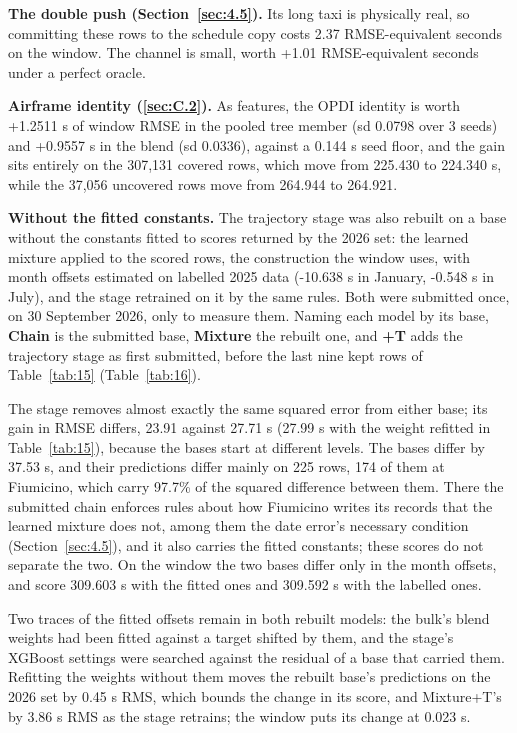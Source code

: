 \documentclass[
  manuscript=article,
  layout=preprint,
  year=2026,
  volume=x,
]{extra/joas}
\begin{document}
\textbf{The double push (Section~\ref{sec:4.5}).} Its long taxi is physically real, so committing these rows to the schedule copy costs 2.37 RMSE-equivalent seconds on the window. The channel is small, worth +1.01 RMSE-equivalent seconds under a perfect oracle.

\textbf{Airframe identity (\ref{sec:C.2}).} As features, the OPDI identity is worth +1.2511 s of window RMSE in the pooled tree member (sd 0.0798 over 3 seeds) and +0.9557 s in the blend (sd 0.0336), against a 0.144 s seed floor, and the gain sits entirely on the 307,131 covered rows, which move from 225.430 to 224.340 s, while the 37,056 uncovered rows move from 264.944 to 264.921.

\textbf{Without the fitted constants.} The trajectory stage was also rebuilt on a base without the constants fitted to scores returned by the 2026 set: the learned mixture applied to the scored rows, the construction the window uses, with month offsets estimated on labelled 2025 data (-10.638 s in January, -0.548 s in July), and the stage retrained on it by the same rules. Both were submitted once, on 30 September 2026, only to measure them. Naming each model by its base, \textbf{Chain} is the submitted base, \textbf{Mixture} the rebuilt one, and \textbf{+T} adds the trajectory stage as first submitted, before the last nine kept rows of Table~\ref{tab:15} (Table~\ref{tab:16}).

The stage removes almost exactly the same squared error from either base; its gain in RMSE differs, 23.91 against 27.71 s (27.99 s with the weight refitted in Table~\ref{tab:15}), because the bases start at different levels. The bases differ by 37.53 s, and their predictions differ mainly on 225 rows, 174 of them at Fiumicino, which carry 97.7\% of the squared difference between them. There the submitted chain enforces rules about how Fiumicino writes its records that the learned mixture does not, among them the date error's necessary condition (Section~\ref{sec:4.5}), and it also carries the fitted constants; these scores do not separate the two. On the window the two bases differ only in the month offsets, and score 309.603 s with the fitted ones and 309.592 s with the labelled ones.

Two traces of the fitted offsets remain in both rebuilt models: the bulk's blend weights had been fitted against a target shifted by them, and the stage's XGBoost settings were searched against the residual of a base that carried them. Refitting the weights without them moves the rebuilt base's predictions on the 2026 set by 0.45 s RMS, which bounds the change in its score, and Mixture+T's by 3.86 s RMS as the stage retrains; the window puts its change at 0.023 s.
\end{document}
